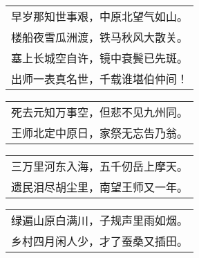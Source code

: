 \nopagebreak%
\nopagebreak%
\noindent\begin{minipage}{\linewidth}
  \vskip-3pt\begin{table}[H]
    \centering
    \begin{tabular}{@{}l@{}}
早岁那知世事艰，中原北望气如山。\\
楼船夜雪瓜洲渡，铁马秋风大散关。\\
塞上长城空自许，镜中衰鬓已先斑。\\
出师一表真名世，千载谁堪伯仲间！
    \end{tabular}
  \end{table}
\end{minipage}
\vspace{1cm}


\nopagebreak%
\nopagebreak%
\noindent\begin{minipage}{\linewidth}
  \vskip-3pt\begin{table}[H]
    \centering
    \begin{tabular}{@{}l@{}}
死去元知万事空，但悲不见九州同。\\
王师北定中原日，家祭无忘告乃翁。
    \end{tabular}
  \end{table}
\end{minipage}
\vspace{1cm}


\nopagebreak%
\nopagebreak%
\noindent\begin{minipage}{\linewidth}
  \vskip-3pt\begin{table}[H]
    \centering
    \begin{tabular}{@{}l@{}}
三万里河东入海，五千仞岳上摩天。\\
遗民泪尽胡尘里，南望王师又一年。
    \end{tabular}
  \end{table}
\end{minipage}
\vspace{1cm}


\nopagebreak%
\nopagebreak%
\noindent\begin{minipage}{\linewidth}
  \vskip-3pt\begin{table}[H]
    \centering
    \begin{tabular}{@{}l@{}}
绿遍山原白满川，子规声里雨如烟。\\
乡村四月闲人少，才了蚕桑又插田。
    \end{tabular}
  \end{table}
\end{minipage}
\vspace{1cm}


